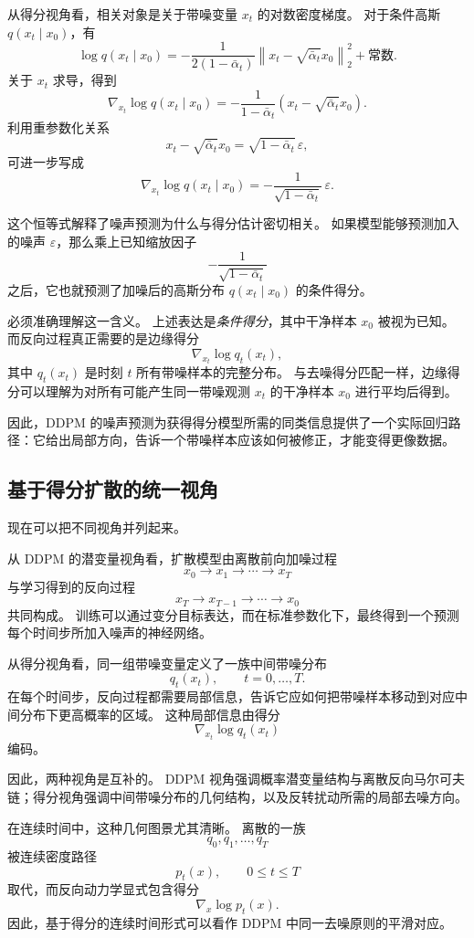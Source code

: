 从得分视角看，相关对象是关于带噪变量 $x_t$ 的对数密度梯度。
对于条件高斯 $q(x_t\mid x_0)$，有
\[
\log q(x_t\mid x_0)
=
-\frac{1}{2(1-\bar{\alpha}_t)}
\left\|
x_t-\sqrt{\bar{\alpha}_t}x_0
\right\|_2^2
+
\text{常数}.
\]
关于 $x_t$ 求导，得到
\[
\nabla_{x_t}\log q(x_t\mid x_0)
=
-\frac{1}{1-\bar{\alpha}_t}
\left(
x_t-\sqrt{\bar{\alpha}_t}x_0
\right).
\]
利用重参数化关系
\[
x_t-\sqrt{\bar{\alpha}_t}x_0
=
\sqrt{1-\bar{\alpha}_t}\,\varepsilon,
\]
可进一步写成
\[
\boxed{
\nabla_{x_t}\log q(x_t\mid x_0)
=
-\frac{1}{\sqrt{1-\bar{\alpha}_t}}\,
\varepsilon.
}
\]

这个恒等式解释了噪声预测为什么与得分估计密切相关。
如果模型能够预测加入的噪声 $\varepsilon$，那么乘上已知缩放因子
\[
-\frac{1}{\sqrt{1-\bar{\alpha}_t}}
\]
之后，它也就预测了加噪后的高斯分布 $q(x_t\mid x_0)$ 的条件得分。

必须准确理解这一含义。
上述表达是\emph{条件得分}，其中干净样本 $x_0$ 被视为已知。
而反向过程真正需要的是边缘得分
\[
\nabla_{x_t}\log q_t(x_t),
\]
其中 $q_t(x_t)$ 是时刻 $t$ 所有带噪样本的完整分布。
与去噪得分匹配一样，边缘得分可以理解为对所有可能产生同一带噪观测 $x_t$ 的干净样本 $x_0$ 进行平均后得到。

因此，DDPM 的噪声预测为获得得分模型所需的同类信息提供了一个实际回归路径：它给出局部方向，告诉一个带噪样本应该如何被修正，才能变得更像数据。

\subsection{基于得分扩散的统一视角}

现在可以把不同视角并列起来。

从 DDPM 的潜变量视角看，扩散模型由离散前向加噪过程
\[
x_0 \rightarrow x_1 \rightarrow \cdots \rightarrow x_T
\]
与学习得到的反向过程
\[
x_T \rightarrow x_{T-1} \rightarrow \cdots \rightarrow x_0
\]
共同构成。
训练可以通过变分目标表达，而在标准参数化下，最终得到一个预测每个时间步所加入噪声的神经网络。

从得分视角看，同一组带噪变量定义了一族中间带噪分布
\[
q_t(x_t),
\qquad
t=0,\dots,T.
\]
在每个时间步，反向过程都需要局部信息，告诉它应如何把带噪样本移动到对应中间分布下更高概率的区域。
这种局部信息由得分
\[
\nabla_{x_t}\log q_t(x_t)
\]
编码。

因此，两种视角是互补的。
DDPM 视角强调概率潜变量结构与离散反向马尔可夫链；得分视角强调中间带噪分布的几何结构，以及反转扰动所需的局部去噪方向。

在连续时间中，这种几何图景尤其清晰。
离散的一族
\[
q_0,q_1,\dots,q_T
\]
被连续密度路径
\[
p_t(x),
\qquad
0\leq t\leq T
\]
取代，而反向动力学显式包含得分
\[
\nabla_x\log p_t(x).
\]
因此，基于得分的连续时间形式可以看作 DDPM 中同一去噪原则的平滑对应。

